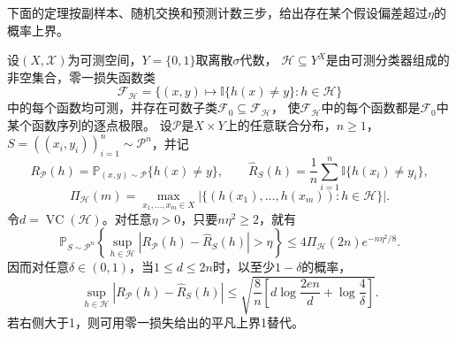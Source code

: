下面的定理按副样本、随机交换和预测计数三步，给出存在某个假设偏差超过$\eta$的概率上界。

\begin{theorem}[VC一致收敛界]
\label{thm:vc-uniform-convergence}
设$(X,\mathcal X)$为可测空间，$Y=\{0,1\}$取离散$\sigma$代数，
$\mathcal H\subseteq Y^X$是由可测分类器组成的非空集合，零一损失函数类
\[
 \mathcal F_{\mathcal H}
 =\{(x,y)\mapsto\mathbb I\{h(x)\neq y\}:h\in\mathcal H\}
\]
中的每个函数均可测，并存在可数子类$\mathcal F_0\subseteq\mathcal F_{\mathcal H}$，
使$\mathcal F_{\mathcal H}$中的每个函数都是$\mathcal F_0$中某个函数序列的逐点极限。
设$\mathcal P$是$X\times Y$上的任意联合分布，$n\geq1$，
$S=((x_i,y_i))_{i=1}^n\sim\mathcal P^n$，并记
\[
 R_{\mathcal P}(h)=\mathbb P_{(x,y)\sim\mathcal P}\{h(x)\neq y\},\qquad
 \hat R_S(h)=\frac1n\sum_{i=1}^n\mathbb I\{h(x_i)\neq y_i\},
\]
\[
 \Pi_{\mathcal H}(m)
 =\max_{x_1,\ldots,x_m\in X}
 \left|\{(h(x_1),\ldots,h(x_m)):h\in\mathcal H\}\right|.
\]
令$d=\operatorname{VC}(\mathcal H)$。对任意$\eta>0$，只要$n\eta^2\geq2$，就有
\begin{equation}
 \mathbb P_{S\sim\mathcal P^n}\left\{
   \sup_{h\in\mathcal H}|R_{\mathcal P}(h)-\hat R_S(h)|>\eta
 \right\}
 \leq4\Pi_{\mathcal H}(2n)e^{-n\eta^2/8}.
 \label{eq:vc-symmetrization-probability}
\end{equation}
因而对任意$\delta\in(0,1)$，当$1\leq d\leq2n$时，以至少$1-\delta$的概率，
\begin{equation}
 \sup_{h\in\mathcal H}|R_{\mathcal P}(h)-\hat R_S(h)|
 \leq
 \sqrt{\frac8n\left[
   d\log\frac{2en}{d}+\log\frac4\delta
 \right]}.
 \label{eq:vc-uniform-bound}
\end{equation}
若右侧大于1，则可用零一损失给出的平凡上界1替代。
\end{theorem}

